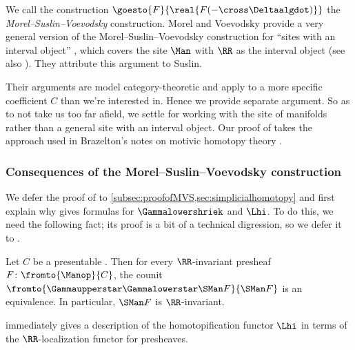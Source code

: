 \begin{remark}
	We call the construction $ \goesto{F}{\real{F(- \cross \Deltaalgdot)}} $ the \textit{Morel--Suslin--Voevodsky} construction.
	Morel and Voevodsky provide a very general version of the Morel--Suslin--Voevodsky construction for ``sites
	with an interval object'' \cite[\S 2.3]{MR1813224}, which covers the site $ \Man $ with $ \RR $ as the interval object (see also \cites[\S 4.3]{MR3727503}[\S 4]{MR3679884}).
	They attribute this argument to Suslin.

	Their arguments are model category-theoretic and apply to a more specific coefficient \categories $ C $ than we're interested in.
	Hence we provide separate argument.
	So as to not take us too far afield, we settle for working with the site of manifolds rather than a general site with an interval object.
	Our proof of  takes the approach used in Brazelton's notes on motivic homotopy theory \cite[\S 3]{Brazelton:A1}.
\end{remark}


\subsubsection{Consequences of the Morel--Suslin--Voevodsky construction}\label{subsubsec:consequencesofMSV}

We defer the proof of  to \cref{subsec:proofofMVS,sec:simplicialhomotopy} and first explain why  gives formulas for $ \Gammalowershriek $ and $ \Lhi $.
To do this, we need the following fact; its proof is a bit of a technical digression, so we defer it to .

\begin{proposition}\label{prop:sheafificationofinvariantisinvariant}
	Let $ C $ be a presentable \category.
	Then for every $ \RR $-invariant presheaf $ F \colon \fromto{\Manop}{C} $, the counit $ \fromto{\Gammaupperstar \Gammalowerstar \SMan F}{\SMan F} $ is an equivalence.
	In particular, $ \SMan F $ is $ \RR $-invariant.
\end{proposition}

\noindent {} immediately gives a description of the homotopification functor $ \Lhi $ in terms of the $ \RR $-localization functor for presheaves.

